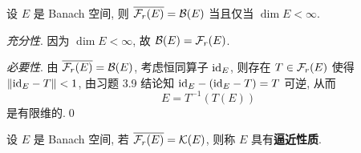     \begin{Proposition}
        设 $ E $ 是 Banach 空间, 则 $ \overline{\mathcal{F}_{r}(E)}=\mathcal{B}(E) $ 当且仅当 $ \dim E<\infty $.
    \end{Proposition}
    \begin{Proof}
        \textsl{充分性}. 因为 $ \dim E<\infty $, 故 $ \mathcal{B}(E)=\mathcal{F}_{r}(E) $.

        \textsl{必要性}. 由 $ \overline{\mathcal{F}_{r}(E)}=\mathcal{B}(E) $, 考虑恒同算子 $ \mathrm{id}_{E} $, 则存在 $ T\in\mathcal{F}_{r}(E) $ 使得 $ \left\| \mathrm{id}_{E}-T \right\|<1 $, 由习题 3.9 结论知 $ \mathrm{id}_{E}-(\mathrm{id}_{E}-T)=T $ 可逆, 从而
        \[
            E = T^{-1}(T(E))
        \]
        是有限维的.\qed
    \end{Proof}

    \begin{Definition}[逼近性质]\label{def:逼近性质}
        设 $ E $ 是 Banach 空间, 若 $ \overline{\mathcal{F}_{r}(E)}=\mathcal{K}(E) $, 则称 $ E $ 具有\textbf{逼近性质}.
    \end{Definition}

